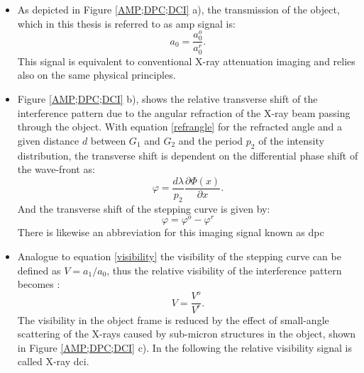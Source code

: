 \begin{itemize}
	\item As depicted in Figure \ref{AMP;DPC;DCI} a), the transmission of the object, which in this thesis is referred to as \acrshort{amp} signal is:
	\begin{equation}
	a_{0} = \frac{a_{0}^{o}}{a_{0}^{r}}.
	\end{equation}
	This signal is equivalent to conventional X-ray attenuation imaging and relies also on the same physical principles.  
	\item Figure \ref{AMP;DPC;DCI} b), shows the relative transverse shift of the interference pattern due to the angular refraction of the X-ray beam passing through the object. With equation \ref{refrangle} for the refracted angle and a given distance $d$ between $G_{1}$ and $G_{2}$ and the period $p_{2}$ of the intensity distribution, the transverse shift is dependent on the differential phase shift of the wave-front as:
	\begin{equation}
	\varphi = \frac{d \lambda}{p_{2}}\frac{\partial\Phi(x)}{\partial x}. 
	\end{equation}
	And the transverse shift of the stepping curve is given by:
	\begin{equation}
	\varphi = \varphi^{o}-\varphi^{r}
	\end{equation}
	There is likewise an abbreviation for this imaging signal known as \gls{dpc}
	\item Analogue to equation \ref{visibility} the visibility of the stepping curve can be defined as $V  =a_{1}/a_{0}$, thus the relative visibility of the interference pattern becomes \citep{Pfeiffer2008}:
	\begin{equation}
	V = \frac{V^{o}}{V^{r}} .
	\end{equation}  
	The visibility in the object frame is reduced by the effect of small-angle scattering of the X-rays caused by sub-micron structures in the object, shown in Figure \ref{AMP;DPC;DCI} c). In the following the relative visibility signal is called X-ray \gls{dci}.  
\end{itemize}

